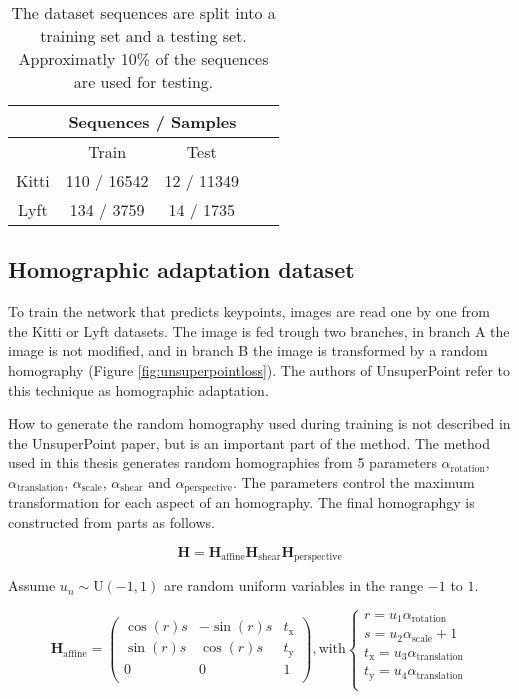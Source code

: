 \begin{table}[H]
	\centering
	\begin{tabular}{ |c|c|c|c|c| } 
		\hline
		&\multicolumn{2}{c|}{Sequences / Samples} \\ 
		\hline
		& Train & Test \\ 
		\hline
		Kitti & 110 / 16542 & 12 / 11349 \\ 
		\hline
		Lyft & 134 / 3759 & 14 / 1735 \\ 
		\hline
	\end{tabular}
	\caption{The dataset sequences are split into a training set and a testing set. Approximatly 10\% of the sequences are used for testing.}
	\label{table:datasets}
\end{table}

\subsection{Homographic adaptation dataset}

To train the network that predicts keypoints, images are read one by one from the Kitti or Lyft datasets. The image is fed trough two branches, in branch A the image is not modified, and in branch B the image is transformed by a random homography (Figure \ref{fig:unsuperpointloss}). The authors of UnsuperPoint refer to this technique as homographic adaptation.

How to generate the random homography used during training is not described in the UnsuperPoint paper, but is an important part of the method. The method used in this thesis generates random homographies from 5 parameters $\alpha_{\mathrm{rotation}}$, $\alpha_{\mathrm{translation}}$, $\alpha_{\mathrm{scale}}$, $\alpha_{\mathrm{shear}}$ and $\alpha_{\mathrm{perspective}}$. The parameters control the maximum transformation for each aspect of an homography. The final homographgy is constructed from parts as follows.

\begin{equation}
\textbf{H} = \textbf{H}_{\mathrm{affine}} \textbf{H}_{\mathrm{shear}} \textbf{H}_{\mathrm{perspective}}
\end{equation}

Assume $u_n \sim \mathrm{U}(-1,1)$ are random uniform variables in the range $-1$ to $1$.

\begin{equation}
\textbf{H}_{\mathrm{affine}} = 
\begin{pmatrix}
\cos(r)s & -\sin(r)s & t_\mathrm{x} \\
\sin(r)s& \cos(r)s & t_\mathrm{y} \\
0 & 0 & 1 \\
\end{pmatrix}
, \text{with}
\begin{cases}
r=u_1\alpha_{\mathrm{rotation}} \\
s=u_2\alpha_{\mathrm{scale}}+1 \\
t_\mathrm{x}=u_3\alpha_{\mathrm{translation}} \\
t_\mathrm{y}=u_4\alpha_{\mathrm{translation}} \\
\end{cases}
\end{equation}

